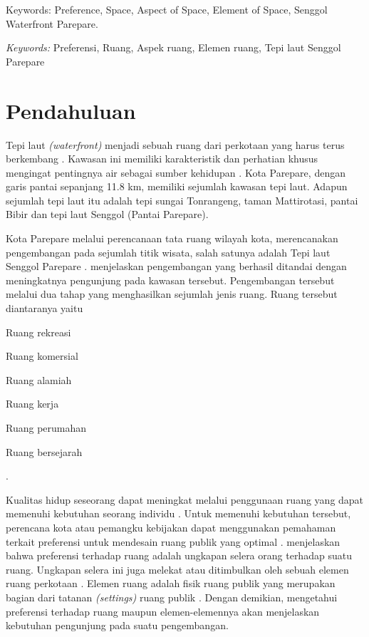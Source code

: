 \documentclass[11pt]{simart} %
\begin{document}
\noindent Keywords: Preference, Space, Aspect of Space, Element of Space, Senggol Waterfront Parepare.

\hspace*{3.6mm}\textit{Keywords:} Preferensi, Ruang, Aspek ruang, Elemen ruang, Tepi laut Senggol Parepare %

\vspace{30pt} %

\section{Pendahuluan}
Tepi laut \textit{(waterfront)} menjadi sebuah ruang dari perkotaan yang harus terus berkembang \citep{shamsuddin2013}.
Kawasan ini memiliki karakteristik dan perhatian khusus mengingat pentingnya air sebagai sumber kehidupan \citep{yassin2010}.
Kota Parepare, dengan garis pantai sepanjang 11.8 km, memiliki sejumlah kawasan tepi laut.
Adapun sejumlah tepi laut itu adalah tepi sungai Tonrangeng, taman Mattirotasi, pantai Bibir dan tepi laut Senggol (Pantai Parepare).

Kota Parepare melalui perencanaan tata ruang wilayah kota, merencanakan pengembangan pada sejumlah titik wisata, salah satunya adalah Tepi laut Senggol Parepare \citep{tri2020}.
\cite{hoyle2001} menjelaskan pengembangan yang berhasil ditandai dengan meningkatnya pengunjung pada kawasan tersebut. Pengembangan tersebut melalui dua tahap yang menghasilkan sejumlah jenis ruang. Ruang tersebut diantaranya yaitu \begin{inparaenum} \item Ruang rekreasi \item Ruang komersial \item Ruang alamiah \item Ruang kerja \item Ruang perumahan \item Ruang bersejarah \end{inparaenum}.


Kualitas hidup seseorang dapat meningkat melalui penggunaan ruang yang dapat memenuhi kebutuhan seorang individu \citep{kim2012}.
Untuk memenuhi kebutuhan tersebut, perencana kota atau pemangku kebijakan dapat menggunakan pemahaman terkait preferensi untuk mendesain ruang publik yang optimal \citep{madureira2018}.
\cite{zhang2006} menjelaskan bahwa preferensi terhadap ruang adalah ungkapan selera orang terhadap suatu ruang.
Ungkapan selera ini juga melekat atau ditimbulkan oleh sebuah elemen ruang perkotaan \citep{knox2014}.
Elemen ruang adalah fisik ruang publik yang merupakan bagian dari tatanan \textit{(settings)} ruang publik \citep{alves2008}.
Dengan demikian, mengetahui preferensi terhadap ruang maupun elemen-elemennya akan menjelaskan kebutuhan pengunjung pada suatu pengembangan.
\end{document}
